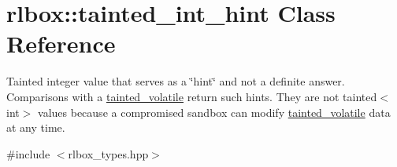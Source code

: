 \hypertarget{classrlbox_1_1tainted__int__hint}{}\section{rlbox\+:\+:tainted\+\_\+int\+\_\+hint Class Reference}
\label{classrlbox_1_1tainted__int__hint}


Tainted integer value that serves as a \char`\"{}hint\char`\"{} and not a definite answer. Comparisons with a \hyperlink{classrlbox_1_1tainted__volatile}{tainted\+\_\+volatile} return such hints. They are not {\ttfamily tainted$<$int$>$} values because a compromised sandbox can modify \hyperlink{classrlbox_1_1tainted__volatile}{tainted\+\_\+volatile} data at any time.  




{\ttfamily \#include $<$rlbox\+\_\+types.\+hpp$>$}


